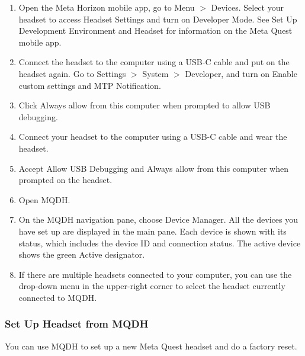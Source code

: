 \documentclass{article}
\begin{document}
\begin{enumerate}
    \item Open the Meta Horizon mobile app, go to Menu $>$ Devices. Select your headset to access Headset Settings and turn on Developer Mode. See Set Up Development Environment and Headset for information on the Meta Quest mobile app.
    \item Connect the headset to the computer using a USB-C cable and put on the headset again. Go to Settings $>$ System $>$ Developer, and turn on Enable custom settings and MTP Notification.
    \item Click Always allow from this computer when prompted to allow USB debugging.
    \item Connect your headset to the computer using a USB-C cable and wear the headset.
    \item Accept Allow USB Debugging and Always allow from this computer when prompted on the headset.
    \item Open MQDH.
    \item On the MQDH navigation pane, choose Device Manager. All the devices you have set up are displayed in the main pane. Each device is shown with its status, which includes the device ID and connection status. The active device shows the green Active designator.
    \item If there are multiple headsets connected to your computer, you can use the drop-down menu in the upper-right corner to select the headset currently connected to MQDH.
\end{enumerate}

\subsubsection{Set Up Headset from MQDH}

You can use MQDH to set up a new Meta Quest headset and do a factory reset.
\end{document}
